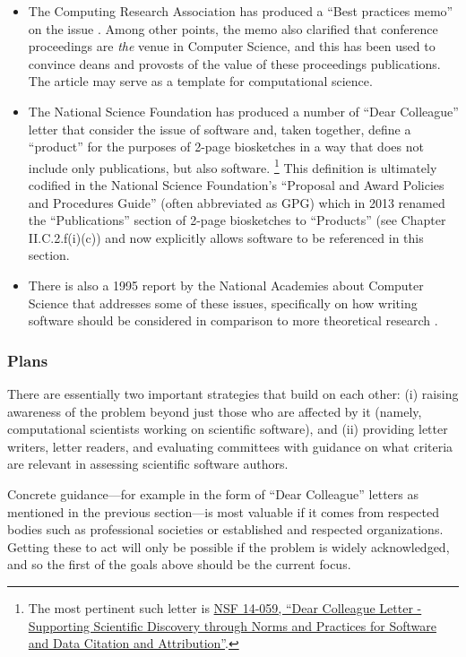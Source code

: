 \begin{itemize}
\item The Computing Research Association has produced a ``Best
  practices memo'' on the issue \cite{PSU99}. Among other points,
  the memo also clarified that conference proceedings are
  \textit{the} venue in Computer Science, and this has been used to
  convince deans and provosts of the value of these proceedings
  publications. The article may serve as a template for computational
  science.
\item The National Science Foundation has produced a number of ``Dear
  Colleague'' letter that consider the issue of software and, taken
  together, define a ``product'' for the purposes of
  2-page biosketches in a way that does not include only publications, but also
  software.%
  \footnote{The most pertinent such letter is
    \href{https://www.nsf.gov/pubs/2014/nsf14059/nsf14059.jsp}{NSF
      14-059, ``Dear Colleague Letter - Supporting Scientific
      Discovery through Norms and Practices for Software and Data
      Citation and Attribution''}.}
  This definition is ultimately codified in the National Science
  Foundation's ``Proposal and Award Policies and Procedures Guide''
  (often abbreviated as GPG) which in 2013 renamed the
  ``Publications'' section of 2-page biosketches to ``Products'' (see
  Chapter II.C.2.f(i)(c)) and now explicitly allows software to be
  referenced in this section.
\item There is also a 1995 report by the National Academies about
  Computer Science that addresses some of these issues, specifically
  on how writing software should be considered in comparison to more
  theoretical research \cite{NRC-careers-94}. 
\end{itemize}



\subsubsection{Plans}

There are essentially two important strategies that build on each
other: (i) raising awareness of the problem beyond just those who are
affected by it (namely, computational scientists working on scientific
software), and (ii) providing letter writers, letter readers, and
evaluating committees with guidance on what criteria are relevant in
assessing scientific software authors.

Concrete guidance---for example in the form of ``Dear Colleague''
letters as mentioned in the previous section---is most valuable if it
comes from respected bodies such as professional societies or
established and respected organizations. Getting these to act
will only be possible if the problem is widely acknowledged, and so
the first of the goals above should be the current focus.

